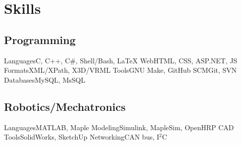 \section{Skills}

\subsection
	{Programming}
\cvcomputer
	{Languages}{C, C++, C\#, Shell/Bash, \LaTeX{}}
    {Web}{HTML, CSS, ASP.NET, JS}
\cvcomputer
	{Formats}{XML/XPath, X3D/VRML}
	{Tools}{GNU Make, GitHub}
\cvcomputer
	{SCM}{Git, SVN}
    {Databases}{MySQL, MsSQL}

\subsection
	{Robotics/Mechatronics}
\cvcomputer
	{Languages}{MATLAB, Maple}
	{Modeling}{Simulink, MapleSim, OpenHRP}
\cvcomputer
	{CAD Tools}{SolidWorks, SketchUp}
	{Networking}{CAN bus, I$^2$C}
